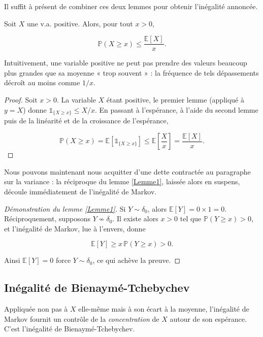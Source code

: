 Il suffit à présent de combiner ces deux lemmes pour obtenir l'inégalité annoncée.

\medskip

\begin{mdframed}
\begin{theoreme}
Soit $X$ une v.a. positive. Alors, pour tout $x > 0$,

$$
\mathbb{P}(X \geq x) \leq \frac{\mathbb{E}[X]}{x}.
$$
\end{theoreme}
\end{mdframed}

Intuitivement, une variable positive ne peut pas prendre des valeurs beaucoup plus grandes que sa moyenne « trop souvent » : la fréquence de tels dépassements décroît au moins comme $1/x$.

\begin{proof}
Soit $x > 0$. La variable $X$ étant positive, le premier lemme (appliqué à $y = X$) donne $\mathbb{1}_{\{X \geq x\}} \leq X/x$. En passant à l'espérance, à l'aide du second lemme puis de la linéarité et de la croissance de l'espérance,

$$
\mathbb{P}(X \geq x) = \mathbb{E}[\mathbb{1}_{\{X \geq x\}}] \leq \mathbb{E}\!\left[ \frac{X}{x} \right] = \frac{\mathbb{E}[X]}{x}.
$$
\end{proof}

Nous pouvons maintenant nous acquitter d'une dette contractée au paragraphe sur la variance : la réciproque du lemme \ref{Lemme1}, laissée alors en suspens, découle immédiatement de l'inégalité de Markov.

\begin{proof}[Démonstration du lemme \ref{Lemme1}]
Si $Y \sim \delta_0$, alors $\mathbb{E}[Y] = 0 \times 1 = 0$. Réciproquement, supposons $Y \not\sim \delta_0$. Il existe alors $x > 0$ tel que $\mathbb{P}(Y \geq x) > 0$, et l'inégalité de Markov, lue à l'envers, donne

$$
\mathbb{E}[Y] \geq x\, \mathbb{P}(Y \geq x) > 0.
$$

Ainsi $\mathbb{E}[Y] = 0$ force $Y \sim \delta_0$, ce qui achève la preuve.
\end{proof}

\subsection{Inégalité de Bienaymé-Tchebychev}

Appliquée non pas à $X$ elle-même mais à son écart à la moyenne, l'inégalité de Markov fournit un contrôle de la \emph{concentration} de $X$ autour de son espérance. C'est l'inégalité de Bienaymé-Tchebychev.

